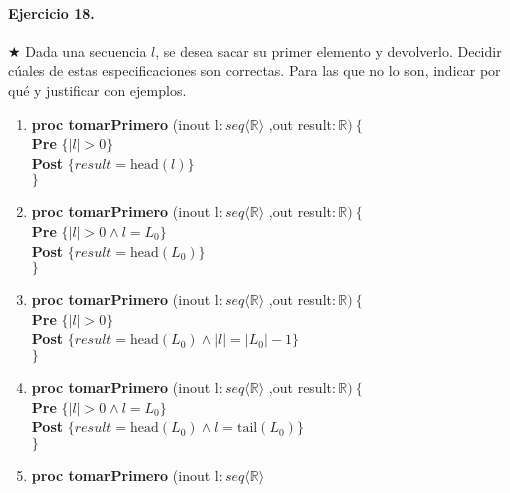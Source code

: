 \documentclass[a4paper]{article}
\begin{document}
\paragraph*{Ejercicio 18.}$\bigstar$ Dada una secuencia $l$, se desea sacar su primer elemento y devolverlo. Decidir cúales de estas especificaciones son correctas. Para las que no lo son, indicar por qué y justificar con ejemplos.
	\begin{enumerate}[label=\alph*)]
		\item
			\textbf{proc tomarPrimero }(inout l$: seq\langle \mathbb{R}\rangle $
			,out result$:\mathbb{R})\ \{$\smallskip \\
			\hspace*{6mm} \textbf{Pre }$\{ |l|> 0\}$\smallskip \\
			\hspace*{6mm} \textbf{Post }$\{result=\textrm{head}(l)\}$\\
			$\}$
		\item
			\textbf{proc tomarPrimero }(inout l$: seq\langle \mathbb{R}\rangle $
			,out result$:\mathbb{R})\ \{$\smallskip \\
			\hspace*{6mm} \textbf{Pre }$\{ |l|> 0\wedge l=L_0\}$\smallskip \\
			\hspace*{6mm} \textbf{Post }$\{result=\textrm{head}(L_0)\}$\\
			$\}$
		\item
			\textbf{proc tomarPrimero }(inout l$: seq\langle \mathbb{R}\rangle $
			,out result$:\mathbb{R})\ \{$\smallskip \\
			\hspace*{6mm} \textbf{Pre }$\{ |l|> 0\}$\smallskip \\
			\hspace*{6mm} \textbf{Post }$\{result=\textrm{head}(L_0)\wedge
					|l|=|L_0|-1\}$\\
			$\}$
		\item
			\textbf{proc tomarPrimero }(inout l$: seq\langle \mathbb{R}\rangle $
			,out result$:\mathbb{R})\ \{$\smallskip \\
			\hspace*{6mm} \textbf{Pre }$\{ |l|> 0\wedge l=L_0\}$\smallskip \\
			\hspace*{6mm} \textbf{Post }$\{result=\textrm{head}(L_0)\wedge
					l=\textrm{tail}(L_0)\}$\\
			$\}$
		\item 
			\textbf{proc tomarPrimero }(inout l$: seq\langle \mathbb{R}\rangle $

\end{enumerate}
\end{document}
